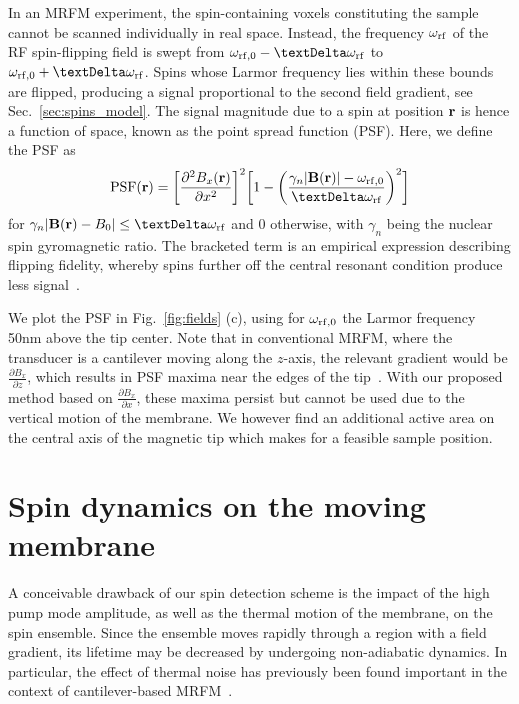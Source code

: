In an MRFM experiment, the spin-containing voxels constituting the sample cannot be scanned individually in real space. Instead, the frequency $\omega_{\rm rf}$ of the RF spin-flipping field is swept from $\omega_{\rm rf,0}-\Delta\omega_{\rm rf}$ to $\omega_{\rm rf,0}+\Delta\omega_{\rm rf}$. Spins whose Larmor frequency lies within these bounds are flipped, producing a signal proportional to the second field gradient, see Sec.~\ref{sec:spins_model}. The signal magnitude due to a spin at position $\vb{r}$ is hence a function of space, known as the point spread function (PSF). Here, we define the PSF as
\begin{equation} \label{eq:PSF}
\text{PSF}(\vb{r}) = \bigg[\frac{\partial^2 B_x (\vb{r})}{\partial x^2}\bigg]^2
\bigg[1-\bigg(\frac{\gamma_n |\vb{B}(\vb{r})| - \omega_{\rm rf,0}}{\Delta\omega_{\rm rf}}\bigg)^2\bigg]
\end{equation}
for $\gamma_n |\vb{B}(\vb{r}) - B_0| \leq \Delta \omega_{\rm rf}$ and 0 otherwise, with $\gamma_n$ being the nuclear spin gyromagnetic ratio. The bracketed term is an empirical expression describing flipping fidelity, whereby spins further off the central resonant condition produce less signal~\cite{Degen_2009}.

We plot the PSF in Fig.~\ref{fig:fields} (c), using for $\omega_{\rm rf,0}$ the Larmor frequency 50\;nm above the tip center. Note that in conventional MRFM, where the transducer is a cantilever moving along the $z$-axis, the relevant gradient would be $\frac{\partial B_x}{\partial z}$, which results in PSF maxima near the edges of the tip~\cite{Degen_2009}. With our proposed method based on $\frac{\partial B_x}{\partial x}$, these maxima persist but cannot be used due to the vertical motion of the membrane. We however find an additional active area on the central axis of the magnetic tip which makes for a feasible sample position. 

\section{Spin dynamics on the moving membrane} \label{app:spins}
A conceivable drawback of our spin detection scheme is the impact of the high pump mode amplitude, as well as the thermal motion of the membrane, on the spin ensemble. Since the ensemble moves rapidly through a region with a field gradient, its lifetime may be decreased by undergoing non-adiabatic dynamics. In particular, the effect of thermal noise has previously been found important in the context of cantilever-based MRFM~\cite{Berman_2003, Mozyrsky_2003}. 

